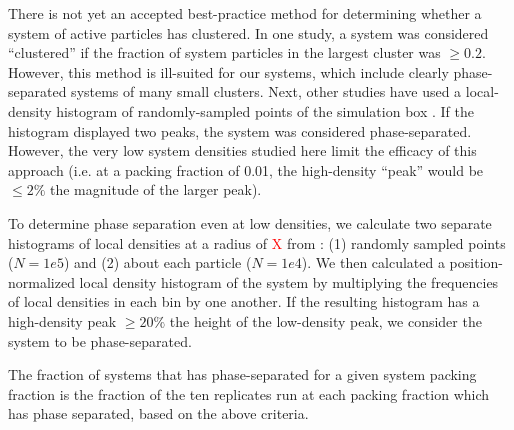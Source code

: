 There is not yet an accepted best-practice method for determining whether a system of active particles has clustered.
In one study, a system was considered ``clustered'' if the fraction of system particles in the largest cluster was ${\geq}0.2$.
However, this method is ill-suited for our systems, which include clearly phase-separated systems of many small clusters.
Next, other studies have used a local-density histogram of randomly-sampled points of the simulation box \cite{Bruss_2017_arxiv}.
If the histogram displayed two peaks, the system was considered phase-separated.
However, the very low system densities studied here limit the efficacy of this approach (i.e. at a packing fraction of 0.01, the high-density ``peak'' would be ${\leq}2\%$ the magnitude of the larger peak).

To determine phase separation even at low densities, we calculate two separate histograms of local densities at a radius of \textcolor{red}{X} from : (1) randomly sampled points ($N=1e5$) and (2) about each particle ($N=1e4$).
We then calculated a position-normalized local density histogram of the system by multiplying the frequencies of local densities in each bin by one another.
If the resulting histogram has a high-density peak ${\geq}20\%$ the height of the low-density peak, we consider the system to be phase-separated.

The fraction of systems that has phase-separated for a given system packing fraction is the fraction of the ten replicates run at each packing fraction which has phase separated, based on the above criteria.





